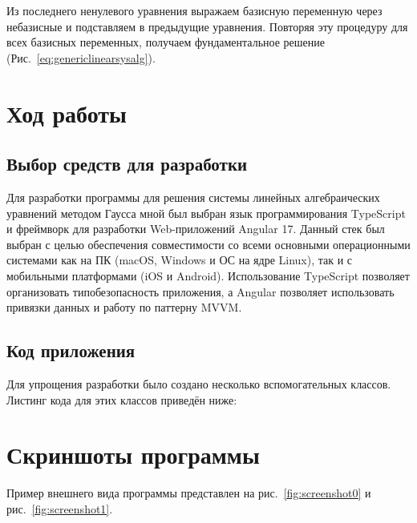 \documentclass[12pt,a4paper]{scrartcl}
\begin{document}
Из последнего ненулевого уравнения выражаем базисную переменную через небазисные и подставляем в предыдущие уравнения. Повторяя эту процедуру для всех базисных переменных, получаем фундаментальное решение (Рис.~\ref{eq:genericlinearsysalg}).


\section{Ход работы}
\label{sec:exp}

\subsection{Выбор средств для разработки}
\label{sec:exp:selection}
Для разработки программы для решения системы линейных алгебраических уравнений методом Гаусса мной был выбран язык программирования TypeScript и фреймворк для разработки Web-приложений Angular 17. Данный стек был выбран с целью обеспечения совместимости со всеми основными операционными системами как на ПК (macOS, Windows и ОС на ядре Linux), так и с мобильными платформами (iOS и Android). Использование TypeScript позволяет организовать типобезопасность приложения, а Angular позволяет использовать привязки данных и работу по паттерну MVVM.

\subsection{Код приложения}
\label{sec:exp:code}
Для упрощения разработки было создано несколько вспомогательных классов. Листинг кода для этих классов приведён ниже:



\newpage




\section{Скриншоты программы}
\label{sec:program-shots}
Пример внешнего вида программы представлен на рис.~\ref{fig:screenshot0} и рис.~\ref{fig:screenshot1}.
\end{document}
